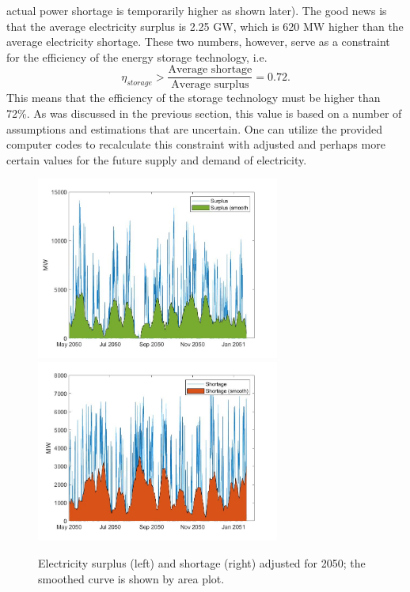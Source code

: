 \documentclass{ECOS_2021}
\begin{document}
actual power shortage is temporarily higher as shown later). The good
news is that the average electricity surplus is 2.25 GW, which is
620 MW higher than the average electricity shortage. These two numbers,
however, serve as a constraint for the efficiency of the energy storage
technology, i.e.
\[
\eta_{storage}>\frac{\text{Average shortage}}{\text{Average surplus}}=0.72.
\]
This means that the efficiency of the storage technology must be higher
than 72\%. As was discussed in the previous section, this value is based on a number of 
assumptions and estimations that are uncertain. One can utilize the provided computer codes 
to recalculate this constraint with adjusted and perhaps more certain values for the future 
supply and demand of electricity.

\begin{figure}[H]
\centering
\includegraphics[width=8cm]{smoothed_surplus}\includegraphics[width=8cm]{smoothed_deficit}

\caption{\label{fig:Electricity-surplus-smooth}Electricity surplus (left)
and shortage (right) adjusted for 2050; the smoothed curve is shown
by area plot.}
\end{figure}
\end{document}
